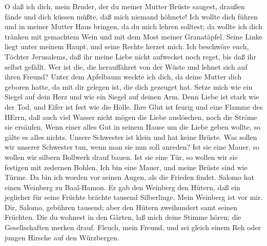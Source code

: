  O daß ich dich, mein Bruder, der du meiner Mutter Brüste
saugest, draußen fände und dich küssen müßte, daß mich niemand höhnete!
 Ich wollte dich führen und in meiner Mutter Haus bringen,
da du mich lehren solltest; da wollte ich dich tränken mit gemachtem
Wein und mit dem Most meiner Granatäpfel.  Seine Linke liegt
unter meinem Haupt, und seine Rechte herzet mich.  Ich
beschwöre euch, Töchter Jerusalems, daß ihr meine Liebe nicht aufwecket
noch reget, bis daß ihr selbst gefällt.  Wer ist die, die
herauffähret von der Wüste und lehnet sich auf ihren Freund? Unter dem
Apfelbaum weckte ich dich, da deine Mutter dich geboren hatte, da mit
dir gelegen ist, die dich gezeuget hat.  Setze mich wie ein
Siegel auf dein Herz und wie ein Siegel auf deinen Arm. Denn Liebe ist
stark wie der Tod, und Eifer ist fest wie die Hölle. Ihre Glut ist
feurig und eine Flamme des HErrn,  daß auch viel Wasser
nicht mögen die Liebe auslöschen, noch die Ströme sie ersäufen. Wenn
einer alles Gut in seinem Hause um die Liebe geben wollte, so gälte es
alles nichts.  Unsere Schwester ist klein und hat keine
Brüste. Was sollen wir unserer Schwester tun, wenn man sie nun soll
anreden?  Ist sie eine Mauer, so wollen wir silbern Bollwerk
drauf bauen. Ist sie eine Tür, so wollen wir sie festigen mit zedernen
Bohlen.  Ich bin eine Mauer, und meine Brüste sind wie
Türme. Da bin ich worden vor seinen Augen, als die Frieden findet.
 Salomo hat einen Weinberg zu Baal-Hamon. Er gab den
Weinberg den Hütern, daß ein jeglicher für seine Früchte brächte tausend
Silberlinge.  Mein Weinberg ist vor mir. Dir, Salomo,
gebühren tausend; aber den Hütern zweihundert samt seinen Früchten.
 Die du wohnest in den Gärten, laß mich deine Stimme hören;
die Gesellschaften merken drauf.  Fleuch, mein Freund, und
sei gleich einem Reh oder jungen Hirsche auf den Würzbergen.
